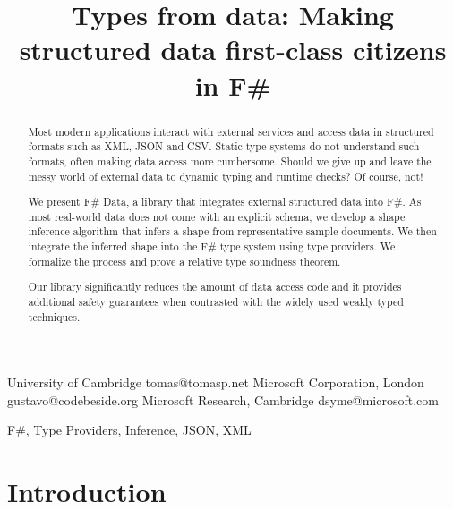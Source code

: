 \documentclass[10pt,nocopyrightspace]{sigplanconf}
\begin{document}
\setlength{\pdfpageheight}{\paperheight}
\setlength{\pdfpagewidth}{\paperwidth}




\title{Types from data: \textnormal{Making structured data first-class citizens in F\#}}


           {University of Cambridge}
           {tomas@tomasp.net}
           {Microsoft Corporation, London}
           {gustavo@codebeside.org}
           {Microsoft Research, Cambridge}
           {dsyme@microsoft.com}
\maketitle



\begin{abstract}
Most modern applications interact with external services and access data in structured formats such
as XML, JSON and CSV. Static type systems do not understand such formats, often making data access
more cumbersome. Should we give up and leave the messy world of external data to dynamic typing
and runtime checks? Of course, not!

We present F\# Data, a library that integrates external structured data into F\#. As most real-world
data does not come with an explicit schema, we develop a shape inference algorithm that infers a
shape from representative sample documents. We then integrate the inferred shape into the F\# type
system using type providers. We formalize the process and prove a relative type soundness theorem.

Our library significantly reduces the amount of data access code and it provides additional
safety guarantees when contrasted with the widely used weakly typed techniques.
\end{abstract}

\keywords F\#, Type Providers, Inference, JSON, XML





\section{Introduction}
\label{sec:introduction}
\end{document}
